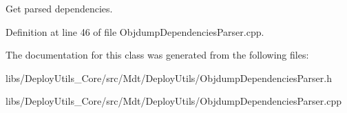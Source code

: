 Get parsed dependencies. 



Definition at line 46 of file Objdump\+Dependencies\+Parser.\+cpp.



The documentation for this class was generated from the following files\+:\begin{DoxyCompactItemize}
\item 
libs/\+Deploy\+Utils\+\_\+\+Core/src/\+Mdt/\+Deploy\+Utils/Objdump\+Dependencies\+Parser.\+h\item 
libs/\+Deploy\+Utils\+\_\+\+Core/src/\+Mdt/\+Deploy\+Utils/Objdump\+Dependencies\+Parser.\+cpp\end{DoxyCompactItemize}
